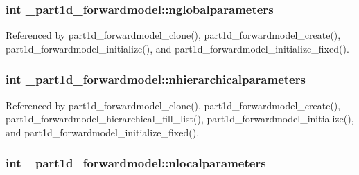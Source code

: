 \subsubsection[{\texorpdfstring{nglobalparameters}{nglobalparameters}}]{\setlength{\rightskip}{0pt plus 5cm}int \+\_\+part1d\+\_\+forwardmodel\+::nglobalparameters}\hypertarget{struct__part1d__forwardmodel_ab70ef8ed00fc885f9985e1e978a3e02a}{}\label{struct__part1d__forwardmodel_ab70ef8ed00fc885f9985e1e978a3e02a}


Referenced by part1d\+\_\+forwardmodel\+\_\+clone(), part1d\+\_\+forwardmodel\+\_\+create(), part1d\+\_\+forwardmodel\+\_\+initialize(), and part1d\+\_\+forwardmodel\+\_\+initialize\+\_\+fixed().

\subsubsection[{\texorpdfstring{nhierarchicalparameters}{nhierarchicalparameters}}]{\setlength{\rightskip}{0pt plus 5cm}int \+\_\+part1d\+\_\+forwardmodel\+::nhierarchicalparameters}\hypertarget{struct__part1d__forwardmodel_a9a5f62d025d12d04c1d78a28293b34fa}{}\label{struct__part1d__forwardmodel_a9a5f62d025d12d04c1d78a28293b34fa}


Referenced by part1d\+\_\+forwardmodel\+\_\+clone(), part1d\+\_\+forwardmodel\+\_\+create(), part1d\+\_\+forwardmodel\+\_\+hierarchical\+\_\+fill\+\_\+list(), part1d\+\_\+forwardmodel\+\_\+initialize(), and part1d\+\_\+forwardmodel\+\_\+initialize\+\_\+fixed().

\subsubsection[{\texorpdfstring{nlocalparameters}{nlocalparameters}}]{\setlength{\rightskip}{0pt plus 5cm}int \+\_\+part1d\+\_\+forwardmodel\+::nlocalparameters}\hypertarget{struct__part1d__forwardmodel_abe35cde3de29b2efc16d64a2f1ea74d9}{}\label{struct__part1d__forwardmodel_abe35cde3de29b2efc16d64a2f1ea74d9}


